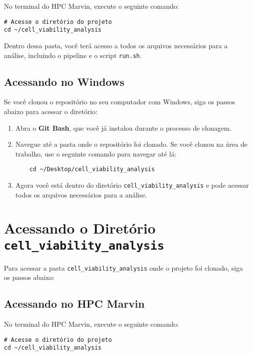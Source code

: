 \documentclass[a4paper, 12pt]{article}
\begin{document}
No terminal do HPC Marvin, execute o seguinte comando:

\begin{verbatim}
# Acesse o diretório do projeto
cd ~/cell_viability_analysis
\end{verbatim}

Dentro dessa pasta, você terá acesso a todos os arquivos necessários para a análise, incluindo o pipeline e o script \texttt{run.sh}.

\subsection{Acessando no Windows}

Se você clonou o repositório no seu computador com Windows, siga os passos abaixo para acessar o diretório:

\begin{enumerate}
    \item Abra o \textbf{Git Bash}, que você já instalou durante o processo de clonagem.
    \item Navegue até a pasta onde o repositório foi clonado. Se você clonou na área de trabalho, use o seguinte comando para navegar até lá:
    \begin{verbatim}
    cd ~/Desktop/cell_viability_analysis
    \end{verbatim}
    \item Agora você está dentro do diretório \texttt{cell\_viability\_analysis} e pode acessar todos os arquivos necessários para a análise.
\end{enumerate}


\section{Acessando o Diretório \texttt{cell\_viability\_analysis}}

Para acessar a pasta \texttt{cell\_viability\_analysis} onde o projeto foi clonado, siga os passos abaixo:

\subsection{Acessando no HPC Marvin}

No terminal do HPC Marvin, execute o seguinte comando:

\begin{verbatim}
# Acesse o diretório do projeto
cd ~/cell_viability_analysis
\end{verbatim}
\end{document}
